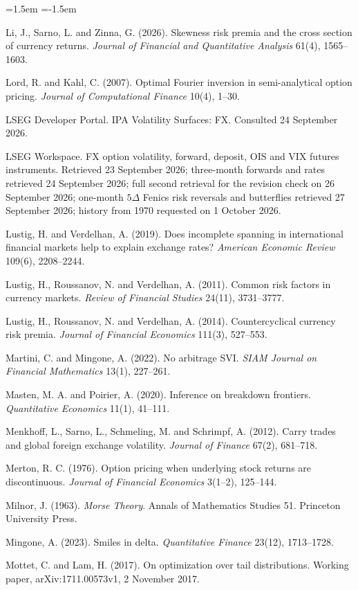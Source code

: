 \documentclass[11pt]{article}
\theoremstyle{result}
\newcommand{\D}{\Delta}
\begin{document}
\begin{list}{}{\leftmargin=1.5em \itemindent=-1.5em \itemsep=2pt \parsep=0pt}
\item Li, J., Sarno, L. and Zinna, G. (2026). Skewness risk premia and the cross section of currency returns. \emph{Journal of Financial and Quantitative Analysis} 61(4), 1565--1603.
\item Lord, R. and Kahl, C. (2007). Optimal Fourier inversion in semi-analytical option pricing. \emph{Journal of Computational Finance} 10(4), 1--30.
\item LSEG Developer Portal. IPA Volatility Surfaces: FX. Consulted 24 September 2026.
\item LSEG Workspace. FX option volatility, forward, deposit, OIS and VIX futures instruments. Retrieved 23 September 2026; three-month forwards and rates retrieved 24 September 2026; full second retrieval for the revision check on 26 September 2026; one-month $5\D$ Fenics risk reversals and butterflies retrieved 27 September 2026; history from 1970 requested on 1 October 2026.
\item Lustig, H. and Verdelhan, A. (2019). Does incomplete spanning in international financial markets help to explain exchange rates? \emph{American Economic Review} 109(6), 2208--2244.
\item Lustig, H., Roussanov, N. and Verdelhan, A. (2011). Common risk factors in currency markets. \emph{Review of Financial Studies} 24(11), 3731--3777.
\item Lustig, H., Roussanov, N. and Verdelhan, A. (2014). Countercyclical currency risk premia. \emph{Journal of Financial Economics} 111(3), 527--553.
\item Martini, C. and Mingone, A. (2022). No arbitrage SVI. \emph{SIAM Journal on Financial Mathematics} 13(1), 227--261.
\item Masten, M. A. and Poirier, A. (2020). Inference on breakdown frontiers. \emph{Quantitative Economics} 11(1), 41--111.
\item Menkhoff, L., Sarno, L., Schmeling, M. and Schrimpf, A. (2012). Carry trades and global foreign exchange volatility. \emph{Journal of Finance} 67(2), 681--718.
\item Merton, R. C. (1976). Option pricing when underlying stock returns are discontinuous. \emph{Journal of Financial Economics} 3(1--2), 125--144.
\item Milnor, J. (1963). \emph{Morse Theory}. Annals of Mathematics Studies 51. Princeton University Press.
\item Mingone, A. (2023). Smiles in delta. \emph{Quantitative Finance} 23(12), 1713--1728.
\item Mottet, C. and Lam, H. (2017). On optimization over tail distributions. Working paper, arXiv:1711.00573v1, 2 November 2017.

\end{list}
\end{document}

